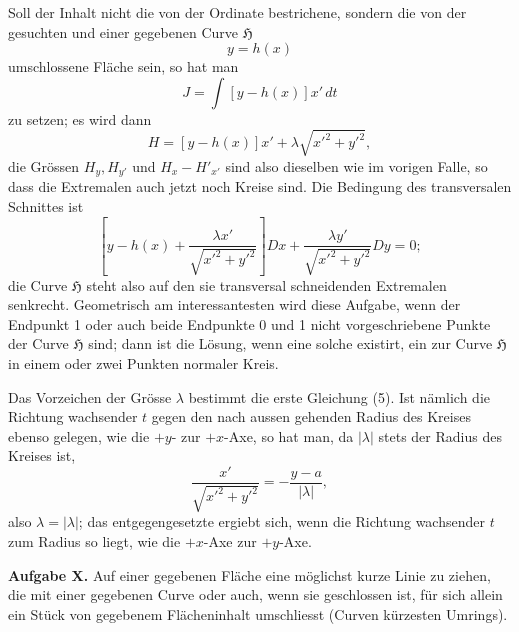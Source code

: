 \documentclass[11pt,a4paper,leqno]{article}
\begin{document}
Soll der Inhalt nicht die von der Ordinate bestrichene, sondern die von der gesuchten und einer gegebenen Curve $\mathfrak{H}$
\[
y=h(x)
\]
umschlossene Fläche sein, so hat man
\[
J=\int [y-h(x)]x'\,dt
\]
zu setzen; es wird dann
\[
H=[y-h(x)]x'+\lambda\sqrt{x'^2+y'^2},
\]
die Grössen $H_y,H_{y'}$ und $H_x-H'_{x'}$ sind also dieselben wie im vorigen Falle, so dass die Extremalen auch jetzt noch Kreise sind. Die Bedingung des transversalen Schnittes ist
\[
\left[y-h(x)+\frac{\lambda x'}{\sqrt{x'^2+y'^2}}\right]Dx+
\frac{\lambda y'}{\sqrt{x'^2+y'^2}}Dy=0;
\]
die Curve $\mathfrak{H}$ steht also auf den sie transversal schneidenden Extremalen senkrecht. Geometrisch am interessantesten wird diese Aufgabe, wenn der Endpunkt 1 oder auch beide Endpunkte 0 und 1 nicht vorgeschriebene Punkte der Curve $\mathfrak{H}$ sind; dann
ist die Lösung, wenn eine solche existirt, ein zur Curve $\mathfrak{H}$ in einem oder zwei Punkten normaler Kreis.

Das Vorzeichen der Grösse $\lambda$ bestimmt die erste Gleichung (5). Ist nämlich die Richtung wachsender $t$ gegen den nach aussen gehenden Radius des Kreises ebenso gelegen, wie die $+y$- zur $+x$-Axe, so hat man, da $|\lambda|$ stets der Radius des Kreises ist,
\[
\frac{x'}{\sqrt{x'^2+y'^2}}=-\frac{y-a}{|\lambda|},
\]
also $\lambda=|\lambda|$; das entgegengesetzte ergiebt sich, wenn die Richtung wachsender $t$ zum Radius so liegt, wie die $+x$-Axe zur $+y$-Axe.

\medskip
\noindent\textbf{Aufgabe X.} Auf einer gegebenen Fläche eine möglichst kurze Linie zu ziehen, die mit einer gegebenen Curve oder auch, wenn sie geschlossen ist, für sich allein ein Stück von gegebenem Flächeninhalt umschliesst (Curven kürzesten Umrings).
\end{document}
